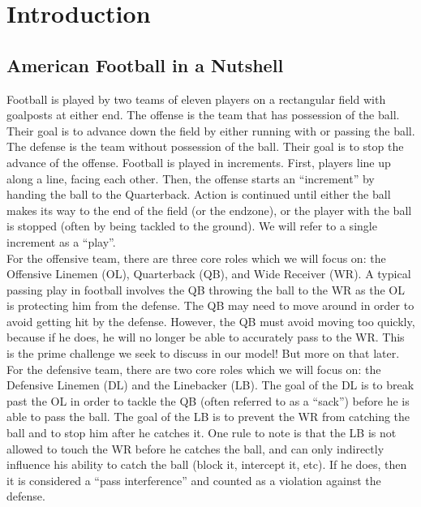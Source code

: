 \setcounter{page}{1} %

\section{Introduction} %

\subsection{American Football in a Nutshell}

\quad Football is played by two teams of eleven players on a rectangular field with goalposts at either end. The offense is the team that has possession of the ball. Their goal is to advance down the field by either running with or passing the ball. The defense is the team without possession of the ball. Their goal is to stop the advance of the offense. Football is played in increments. First, players line up along a line, facing each other. Then, the offense starts an “increment” by handing the ball to the Quarterback. Action is continued until either the ball makes its way to the end of the field (or the endzone), or the player with the ball is stopped (often by being tackled to the ground). We will refer to a single increment as a “play”. \\ 
 
For the offensive team, there are three core roles which we will focus on: the Offensive Linemen (OL), Quarterback (QB), and Wide Receiver (WR). A typical passing play in football involves the QB throwing the ball to the WR as the OL is protecting him from the defense. The QB may need to move around in order to avoid getting hit by the defense. However, the QB must avoid moving too quickly, because if he does, he will no longer be able to accurately pass to the WR. This is the prime challenge we seek to discuss in our model! But more on that later. \\ 
 
For the defensive team, there are two core roles which we will focus on: the Defensive Linemen (DL) and the Linebacker (LB). The goal of the DL is to break past the OL in order to tackle the QB (often referred to as a “sack”) before he is able to pass the ball. The goal of the LB is to prevent the WR from catching the ball and to stop him after he catches it. One rule to note is that the LB is not allowed to touch the WR before he catches the ball, and can only indirectly influence his ability to catch the ball (block it, intercept it, etc). If he does, then it is considered a “pass interference” and counted as a violation against the defense. \\

